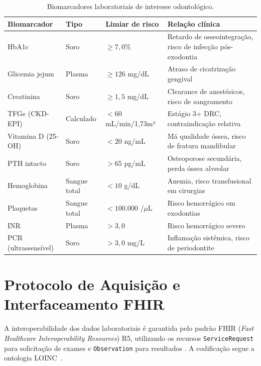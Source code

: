 \begin{longtable}{p{3cm}p{2.5cm}p{3cm}p{3cm}}
\caption{Biomarcadores laboratoriais de interesse odontológico.}
\label{tab:biomarcadores}\\
\toprule
\textbf{Biomarcador} & \textbf{Tipo} & \textbf{Limiar de risco} & \textbf{Relação clínica} \\
\midrule
HbA1c & Soro & $\geq 7,0\%$ & Retardo de osseointegração, risco de infecção pós-exodontia \\
Glicemia jejum & Plasma & $\geq 126$ mg/dL & Atraso de cicatrização gengival \\
Creatinina & Soro & $\geq 1,5$ mg/dL & Clearance de anestésicos, risco de sangramento \\
TFGe (CKD-EPI) & Calculado & $<60$ mL/min/1,73m² & Estágio 3+ DRC, contraindicação relativa \\
Vitamina D (25-OH) & Soro & $<20$ ng/mL & Má qualidade óssea, risco de fratura mandibular \\
PTH intacto & Soro & $>65$ pg/mL & Osteoporose secundária, perda óssea alveolar \\
Hemoglobina & Sangue total & $<10$ g/dL & Anemia, risco transfusional em cirurgias \\
Plaquetas & Sangue total & $<100.000$ /$\mu$L & Risco hemorrágico em exodontias \\
INR & Plasma & $>3,0$ & Risco hemorrágico severo \\
PCR (ultrassensível) & Soro & $>3,0$ mg/L & Inflamação sistêmica, risco de periodontite \\
\bottomrule
\end{longtable}

\section{Protocolo de Aquisição e Interfaceamento FHIR}
\label{sec:protocolo-fhir}

A interoperabilidade dos dados laboratoriais é garantida pelo padrão FHIR (\textit{Fast Healthcare Interoperability Resources}) R5, utilizando os recursos \texttt{ServiceRequest} para solicitação de exames e \texttt{Observation} para resultados \cite{fhir2024}. A codificação segue a ontologia LOINC~\cite{loinc2024}.

